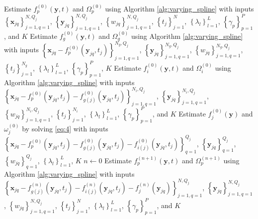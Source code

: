 \documentclass[11pt,reqno]{article}
\theoremstyle{definition}
\begin{document}
\begin{algorithm}
  Estimate $f_{p}^{(0)}(\mathbf{y}, t)$ and $\Omega_{p}^{(0)}$ using Algorithm \ref{alg:varying_spline} with inputs $\left\{\mathbf{x}_{jq}\right\}_{j=1, q=1}^{N, Q_j}$, $\left\{\mathbf{y}_{jq}\right\}_{j=1, q=1}^{N, Q_j}$, $\left\{w_{jq}\right\}_{j=1, q=1}^{N, Q_j}$, $\left\{t_{j}\right\}_{j=1}^{N}$, $\left\{\lambda_l\right\}_{l=1}^{L}$, $\left\{\gamma_p\right\}_{p=1}^{P}$, and $K$\;
   {
    Estimate $f_{g}^{(0)}(\mathbf{y}, t)$ and $\Omega_{g}^{(0)}$ using Algorithm \ref{alg:varying_spline} with inputs $\left\{\mathbf{x}_{jq} - f_{p}^{(0)}(\mathbf{y}_{jq}, t_j)\right\}_{j=1, q=1}^{N_g, Q_j}$, $\left\{\mathbf{y}_{jq}\right\}_{j=1, q=1}^{N_g, Q_j}$, $\left\{w_{jq}\right\}_{j=1, q=1}^{N_g, Q_j}$, $\left\{t_j\right\}_{j=1}^{N_g}$, $\left\{\lambda_l\right\}_{l=1}^{L}$, $\left\{\gamma_p\right\}_{p=1}^{P}$, $K$\;
  }
   {
    Estimate $f_{i}^{(0)}(\mathbf{y}, t)$ and $\Omega_{i}^{(0)}$ using Algorithm \ref{alg:varying_spline} with inputs $\left\{\mathbf{x}_{jq} - f_{p}^{(0)}(\mathbf{y}_{jq}, t_j) - f_{g(j)}^{(0)}(\mathbf{y}_{jq}, t_j)\right\}_{j=1, q=1}^{N_i, Q_j}$, $\left\{\mathbf{y}_{jq}\right\}_{j=1, q=1}^{N_i, Q_j}$, $\left\{w_{jq}\right\}_{j=1, q=1}^{N_i, Q_j}$, $\left\{t_j\right\}_{j=1}^{N_i}$, $\left\{\lambda_l\right\}_{l=1}^{L}$, $\left\{\gamma_p\right\}_{p=1}^{P}$, and $K$\;
  }
   {
    Estimate $f_{j}^{(0)}(\mathbf{y})$ and $\omega_{j}^{(0)}$ by solving \ref{eq:4} with inputs $\left\{\mathbf{x}_{jq} - f_{p}^{(0)}(\mathbf{y}_{jq}, t_j) - f_{g(j)}^{(0)}(\mathbf{y}_{jq}, t_j) - f_{i(j)}^{(0)}(\mathbf{y}_{jq}, t_j)\right\}_{q=1}^{Q_j}$, $\left\{\mathbf{y}_{jq}\right\}_{q=1}^{Q_j}$, $\left\{w_{jq}\right\}_{q = 1}^{Q_j}$, $\left\{\lambda_l\right\}_{l=1}^{L}$, $K$\;
  }
  $n \gets 0$\;
   {
    Estimate $f_{p}^{(n+1)}(\mathbf{y}, t)$ and $\Omega_{p}^{(n+1)}$ using Algorithm \ref{alg:varying_spline} with inputs $\left\{\mathbf{x}_{jq} - f_{g(j)}^{(n)}(\mathbf{y}_{jq}, t_j) - f_{i(j)}^{(n)}(\mathbf{y}_{jq}, t_j) - f_j^{(n)}(\mathbf{y}_{jq})\right\}_{j=1, q=1}^{N, Q_j}$, $\left\{\mathbf{y}_{jq}\right\}_{j=1, q=1}^{N, Q_j}$, $\left\{w_{jq}\right\}_{j=1, q=1}^{N, Q_j}$, $\left\{t_{j}\right\}_{j=1}^{N}$, $\left\{\lambda_l\right\}_{l=1}^{L}$, $\left\{\gamma_p\right\}_{p=1}^{P}$, and $K$\;
     {
}}
\end{algorithm}
\end{document}
